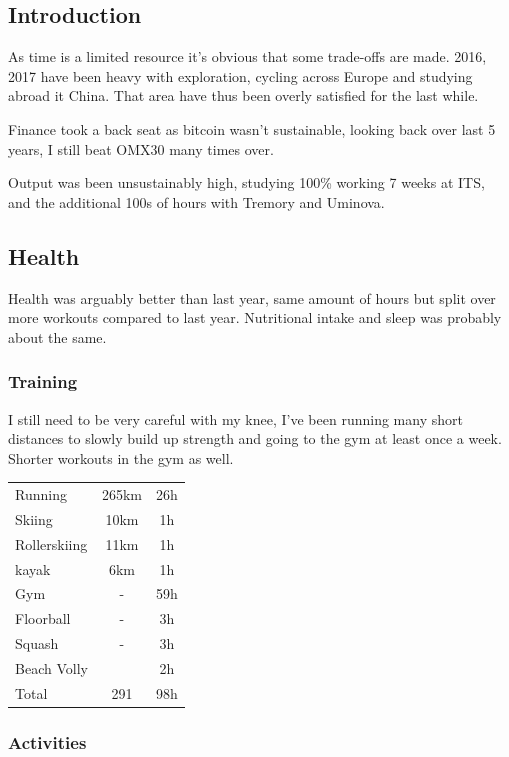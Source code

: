 \documentclass[a4paper]{article}
\begin{document}
	\subsection{Introduction}
	
	As time is a limited resource it's obvious that some trade-offs are made. 2016, 2017 have been heavy with exploration, cycling across Europe and studying abroad it China. That area have thus been overly satisfied for the last while.
	
	Finance took a back seat as bitcoin wasn't sustainable, looking back over last 5 years, I still beat OMX30 many times over.
	
	Output was been unsustainably high, studying 100\% working 7 weeks at ITS, and the additional 100s of hours with Tremory and Uminova.
	
	\subsection{Health}
	
	Health was arguably better than last year, same amount of hours but split over more workouts compared to last year. Nutritional intake and sleep was probably about the same.
	
	\subsubsection{Training}
	
	I still need to be very careful with my knee, I've been running many short distances to slowly build up strength and going to the gym at least once a week. Shorter workouts in the gym as well.
	
	\begin{tabular}{l|c|c}
		Running & 265km & 26h\\
		Skiing & 10km & 1h\\
		Rollerskiing & 11km & 1h\\
		kayak & 6km & 1h\\
		Gym & - & 59h\\
		Floorball & - & 3h\\
		Squash & - & 3h\\
		Beach Volly &  & 2h\\
		
		Total & 291 & 98h
		
	\end{tabular}
	
	\subsubsection{Activities}
	
\end{document}
